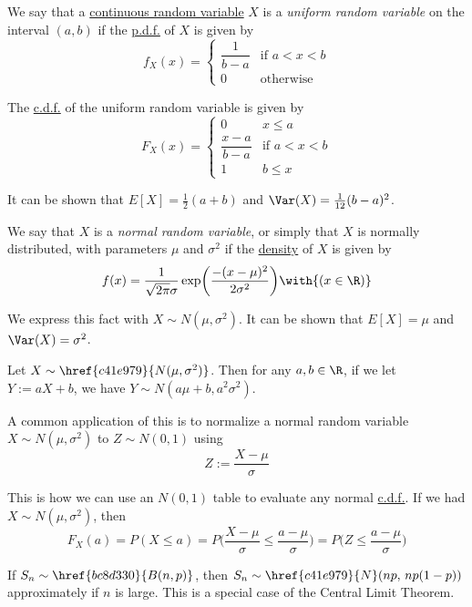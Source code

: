 \label{cc74e75}

We say that a \href{bdb1e15}{continuous random variable} $X$ is a
\textit{uniform random variable} on the interval $(a,b)$ if the
\href{cb9d3f0}{p.d.f.} of $X$ is given by
$$
  f_X(x)=\begin{cases}
    \dfrac1{b-a} & \text{if }a<x<b  \\
    0            & \text{otherwise}
  \end{cases}
$$

The \href{ad1290d}{c.d.f.} of the uniform random variable is given by
$$
  F_X(x)=\begin{cases}
    0                & x\leq a         \\
    \dfrac{x-a}{b-a} & \text{if }a<x<b \\
    1                & b\leq x
  \end{cases}
$$

It can be shown that $E[X]=\frac12(a+b)$ and $\Var(X)=\frac1{12}(b-a)^2$.

\label{c41e979}

We say that $X$ is a \textit{normal random variable}, or simply that $X$ is
normally distributed, with parameters $\mu$ and $\sigma^2$ if the
\href{cb9d3f0}{density} of $X$ is given by
$$
  f(x)=\frac1{\sqrt{2\pi}\sigma}\exp\biggl(\frac{-(x-\mu)^2}{2\sigma^2}\biggr)\with{(x\in\R)}
$$

We express this fact with $X\sim N(\mu,\sigma^2)$. It can be shown that
$E[X]=\mu$ and $\Var(X)=\sigma^2$.

\label{b6873d0}

Let $X\sim\href{c41e979}{N(\mu,\sigma^2)}$. Then for any $a,b\in\R$, if we let
$Y:=aX+b$, we have $Y\sim N(a\mu+b,a^2\sigma^2)$.

A common application of this is to normalize a normal random variable $X\sim
N(\mu,\sigma^2)$ to $Z\sim N(0,1)$ using
$$
  Z:=\frac{X-\mu}\sigma
$$

This is how we can use an $N(0,1)$ table to evaluate any normal
\href{ad1290d}{c.d.f.}. If we had $X\sim N(\mu,\sigma^2)$, then
$$
  F_X(a)
  =P(X\leq a)
  =P\biggl(\frac{X-\mu}\sigma\leq\frac{a-\mu}\sigma\biggr)
  =P\biggl(Z\leq\frac{a-\mu}\sigma\biggr)
$$

\label{b1678f4}

If $S_n\sim\href{bc8d330}{B(n,p)}$, then
$S_n\sim\href{c41e979}{N}(np,\,np(1-p))$ approximately if $n$ is large. This is
a special case of the Central Limit Theorem.

